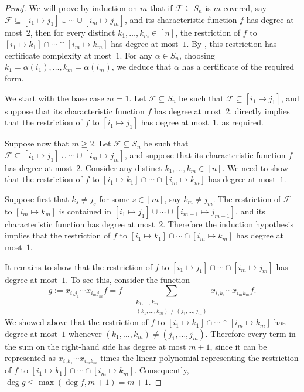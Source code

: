\documentclass[10pt,a4paper]{article}
\theoremstyle{definition}
\providecommand{\coset}[2]{[#1 \mapsto #2]}
\begin{document}
\begin{proof}
We will prove by induction on $m$ that if $\mathcal{F} \subseteq S_n$ is $m$-covered, say $\mathcal{F} \subseteq \coset{i_1}{j_1} \cup \cdots \cup \coset{i_m}{j_m}$, and its characteristic function $f$ has degree at most~$2$, then for every distinct $k_1,\ldots,k_m \in [n]$, the restriction of $f$ to $\coset{i_1}{k_1} \cap \cdots \cap \coset{i_m}{k_m}$ has degree at most~$1$. By , this restriction has certificate complexity at most~$1$. For any $\alpha \in S_n$, choosing $k_1 = \alpha(i_1),\ldots,k_m = \alpha(i_m)$, we deduce that $\alpha$ has a certificate of the required form.

We start with the base case $m = 1$. Let $\mathcal{F} \subseteq S_n$ be such that $\mathcal{F} \subseteq \coset{i_1}{j_1}$, and suppose that its characteristic function $f$ has degree at most~$2$.  directly implies that the restriction of $f$ to $\coset{i_1}{j_1}$ has degree at most~$1$, as required.

Suppose now that $m \geq 2$. Let $\mathcal{F} \subseteq S_n$ be such that $\mathcal{F} \subseteq \coset{i_1}{j_1} \cup \cdots \cup \coset{i_m}{j_m}$, and suppose that its characteristic function $f$ has degree at most~$2$. Consider any distinct $k_1,\ldots,k_m \in [n]$. We need to show that the restriction of $f$ to $\coset{i_1}{k_1} \cap \cdots \cap \coset{i_m}{k_m}$ has degree at most~$1$.

Suppose first that $k_s \neq j_s$ for some $s \in [m]$, say $k_m \neq j_m$. The restriction of $\mathcal{F}$ to $\coset{i_m}{k_m}$ is contained in $\coset{i_1}{j_1} \cup \cdots \cup \coset{i_{m-1}}{j_{m-1}}$, and its characteristic function has degree at most~$2$. Therefore the induction hypothesis implies that the restriction of $f$ to $\coset{i_1}{k_1} \cap \cdots \cap \coset{i_m}{k_m}$ has degree at most~$1$.

It remains to show that the restriction of $f$ to $\coset{i_1}{j_1} \cap \cdots \cap \coset{i_m}{j_m}$ has degree at most~$1$. To see this, consider the function
\[
 g := x_{i_1j_1} \cdots x_{i_mj_m} f = f - \sum_{\substack{k_1,\ldots,k_m \\ (k_1,\ldots,k_m) \neq (j_1,\ldots,j_m)}} x_{i_1k_1} \cdots x_{i_mk_m} f.
\]
We showed above that the restriction of $f$ to $\coset{i_1}{k_1} \cap \cdots \cap \coset{i_m}{k_m}$ has degree at most~$1$ whenever $(k_1,\ldots,k_m) \neq (j_1,\ldots,j_m)$. Therefore every term in the sum on the right-hand side has degree at most $m+1$, since it can be represented as $x_{i_1k_1} \cdots x_{i_mk_m}$ times the linear polynomial representing the restriction of $f$ to $\coset{i_1}{k_1} \cap \cdots \cap \coset{i_m}{k_m}$. Consequently, $\deg g \leq \max(\deg f, m+1) = m+1$.


\end{proof}
\end{document}
